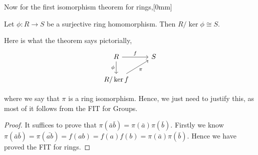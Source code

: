 
Now for the first isomorphism theorem for rings,[0mm]
\begin{nthm}
  Let $\phi : R \to S$ be a surjective ring homomorphism. Then $R/\ker\phi \cong S$.
\end{nthm}
Here is what the theorem says pictorially,
\[\begin{tikzcd}
	R & S \\
	{R/\ker f}
	\arrow["f", from=1-1, to=1-2]
	\arrow["\phi"', from=1-1, to=2-1]
	\arrow["\pi"', from=2-1, to=1-2]
\end{tikzcd}\]

where we say that $\pi$ is a ring isomorphism. Hence, we just need to justify this, as most of it follows from the FIT for Groups.
\begin{proof}
  It suffices to prove that $\pi(\bar a\bar b) = \pi(\bar a)\pi(\bar b)$. Firstly we know $\pi(\bar a\bar b) = \pi(\bar{ab}) = f(ab) = f(a)f(b) = \pi(\bar a)\pi(\bar b)$. Hence we have proved the FIT for rings.
\end{proof}


